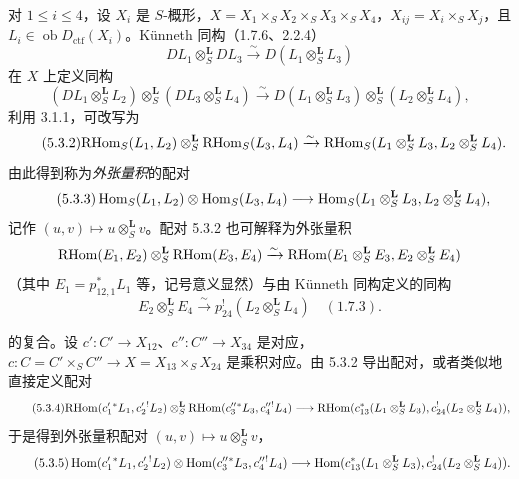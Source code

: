 对 $1\leq i\leq 4$，设 $X_i$ 是 $S$-概形，$X=X_1\times_SX_2\times_SX_3\times_SX_4$，$X_{ij}=X_i\times_SX_j$，且 $L_i\in\operatorname{ob}D_{\mathrm{ctf}}(X_i)$。Künneth 同构（1.7.6、2.2.4）
\[
DL_1\otimes_S^{\mathbf L}DL_3\xrightarrow{\sim}D(L_1\otimes_S^{\mathbf L}L_3)
\]
在 $X$ 上定义同构
\begin{equation}
\tag{5.3.1}
(DL_1\otimes_S^{\mathbf L}L_2)\otimes_S^{\mathbf L}(DL_3\otimes_S^{\mathbf L}L_4)
\xrightarrow{\sim}D(L_1\otimes_S^{\mathbf L}L_3)\otimes_S^{\mathbf L}(L_2\otimes_S^{\mathbf L}L_4),
\end{equation}
利用 3.1.1，可改写为
\begin{equation}
\tag{5.3.2}
\mathrm{RHom}_S(L_1,L_2)\otimes_S^{\mathbf L}\mathrm{RHom}_S(L_3,L_4)
\xrightarrow{\sim}\mathrm{RHom}_S(L_1\otimes_S^{\mathbf L}L_3,L_2\otimes_S^{\mathbf L}L_4).
\end{equation}
由此得到称为\emph{外张量积}的配对
\begin{equation}
\tag{5.3.3}
\operatorname{Hom}_S(L_1,L_2)\otimes\operatorname{Hom}_S(L_3,L_4)
\longrightarrow\operatorname{Hom}_S(L_1\otimes_S^{\mathbf L}L_3,L_2\otimes_S^{\mathbf L}L_4),
\end{equation}
记作 $(u,v)\mapsto u\otimes_S^{\mathbf L}v$。配对 5.3.2 也可解释为外张量积
\[
\mathrm{RHom}(E_1,E_2)\otimes_S^{\mathbf L}\mathrm{RHom}(E_3,E_4)
\xrightarrow{\sim}\mathrm{RHom}(E_1\otimes_S^{\mathbf L}E_3,E_2\otimes_S^{\mathbf L}E_4)
\]
（其中 $E_1=p_{12,1}^*L_1$ 等，记号意义显然）与由 Künneth 同构定义的同构
\[
E_2\otimes_S^{\mathbf L}E_4\xrightarrow{\sim}p_{24}^!(L_2\otimes_S^{\mathbf L}L_4)\quad (1.7.3).
\]

的复合。设 $c':C'\to X_{12}$、$c'':C''\to X_{34}$ 是对应，$c:C=C'\times_SC''\to X=X_{13}\times_SX_{24}$ 是乘积对应。由 5.3.2 导出配对，或者类似地直接定义配对
\begin{equation}
\tag{5.3.4}
\mathrm{RHom}(c_1'{}^*L_1,c_2'{}^!L_2)\otimes_S^{\mathbf L}\mathrm{RHom}(c_3''{}^*L_3,c_4''{}^!L_4)
\longrightarrow\mathrm{RHom}(c_{13}^*(L_1\otimes_S^{\mathbf L}L_3),c_{24}^!(L_2\otimes_S^{\mathbf L}L_4)),
\end{equation}
于是得到外张量积配对 $(u,v)\mapsto u\otimes_S^{\mathbf L}v$，
\begin{equation}
\tag{5.3.5}
\operatorname{Hom}(c_1'{}^*L_1,c_2'{}^!L_2)\otimes\operatorname{Hom}(c_3''{}^*L_3,c_4''{}^!L_4)
\longrightarrow\operatorname{Hom}(c_{13}^*(L_1\otimes_S^{\mathbf L}L_3),c_{24}^!(L_2\otimes_S^{\mathbf L}L_4)).
\end{equation}

